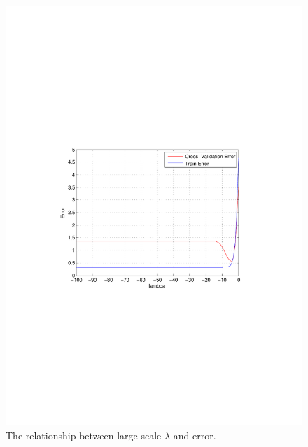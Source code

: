 \documentclass[letterpaper,12pt]{article}
\numberwithin{equation}{section}
\begin{document}
\begin{figure}[H]
\vspace{-8.5cm}
 
\centering
      \includegraphics[scale=0.8]{-100-0}
\vspace{-8.3cm}
\caption{\label{fig:large_scale} 
The relationship between large-scale $\lambda$ and error.}
       
\end{figure}
\end{document}
